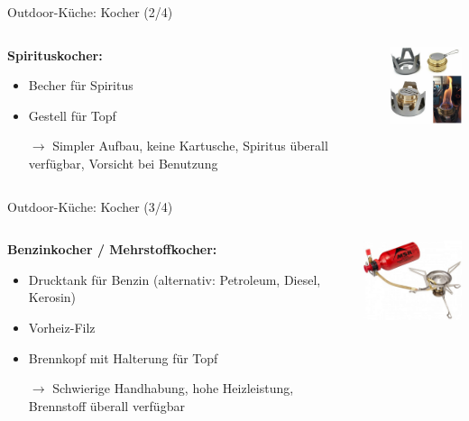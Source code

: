 \documentclass{beamer}
\newcommand{\sarrow}{\small$\rightarrow$}
\begin{document}
			\begin{frame}{Outdoor-Küche: Kocher (2/4)}
				\begin{columns}[c]
					\begin{column}{0.69\textwidth}
						\textbf{Spirituskocher:}
						\begin{itemize}
							\item Becher für Spiritus
							\item Gestell für Topf
							\item[\sarrow] Simpler Aufbau, keine Kartusche, Spiritus überall verfügbar, Vorsicht bei Benutzung
						\end{itemize}
					\end{column}
					\begin{column}{0.29\textwidth}
						\includegraphics[width=3cm]{images/kocher-spiritus.png}
					\end{column}
				\end{columns}
			\end{frame}
		
			\begin{frame}{Outdoor-Küche: Kocher (3/4)}
				\begin{columns}[c]
					\begin{column}{0.62\textwidth}
						\textbf{Benzinkocher / Mehrstoffkocher:}
						\begin{itemize}
							\item Drucktank für Benzin (alternativ: Petroleum, Diesel, Kerosin)
							\item Vorheiz-Filz
							\item Brennkopf mit Halterung für Topf
							\item[\sarrow] Schwierige Handhabung, hohe Heizleistung, Brennstoff überall verfügbar
						\end{itemize}
					\end{column}
					\begin{column}{0.36\textwidth}
						\includegraphics[width=3.85cm]{images/kocher-benzin.png}
					\end{column}
				\end{columns}
			\end{frame}
		
\end{document}
